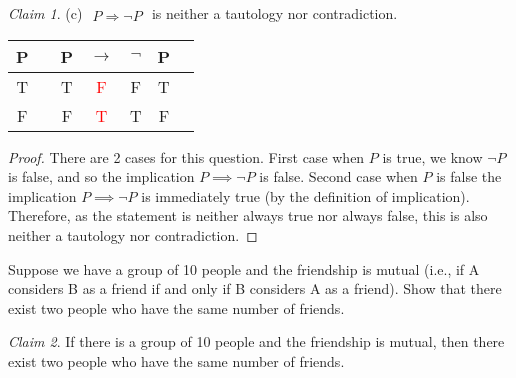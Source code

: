 \documentclass{homework}
\theoremstyle{remark}
\newtheorem*{claim}{Claim}
\newcommand{\?}{\stackrel{?}{=}}
\begin{document}
\begin{claim}
    (c) $\begin{aligned}P\Rightarrow\neg P\end{aligned}$ is neither a tautology nor contradiction. 
\end{claim}

\begin{center}
\begin{tabular}{@{ }c | c@{ }@{ }c@{ }@{ }c@{ }@{ }c@{ }@{ }c@{ }@{ }c}
P &  & P & $\rightarrow$ & $\lnot$ & P & \\
\hline 
T &  & T & \textcolor{red}{F} & F & T & \\
F &  & F & \textcolor{red}{T} & T & F & \\
\end{tabular}
\end{center}
\begin{proof}
    There are 2 cases for this question.  First case when $P$ is true, we know $\neg P$ is false, and so the implication $P\implies\neg P$ is false. Second case when $P$ is false the implication $P\implies\neg P$ is immediately true (by the definition of implication). Therefore, as the statement is neither always true nor always false, this is also neither a tautology nor contradiction.
\end{proof}

\newpage

\question Suppose we have a group of 10 people and the friendship is mutual (i.e., if A considers B as a friend if and only if B considers A as a friend).
Show that there exist two people who have the same number of friends.

\begin{claim}
    If there is a group of 10 people and the friendship is mutual, then there exist two people who have the same number of friends. 
\end{claim}
\end{document}
